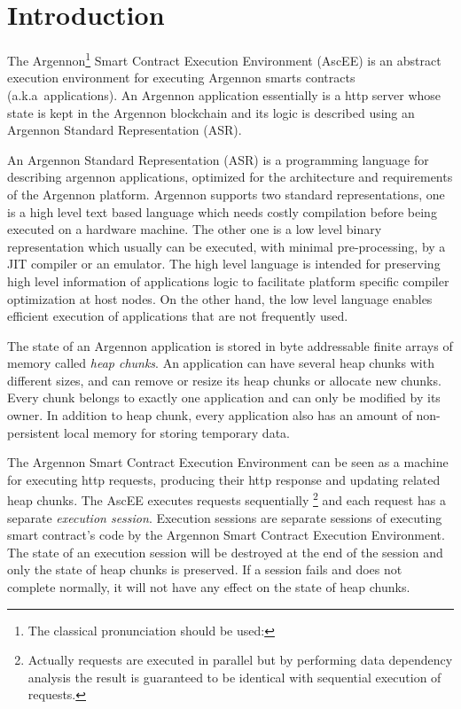 

\section{Introduction}\label{sec:introduction}

The Argennon\footnote{The classical pronunciation should be used:} Smart Contract Execution
Environment (AscEE) is an abstract execution environment for executing Argennon smarts contracts (a.k.a\ applications).
An Argennon application essentially is a http server whose state is kept in the Argennon blockchain and
its logic is described using an Argennon Standard Representation (ASR).

An Argennon Standard Representation (ASR) is a programming language for describing argennon applications, optimized
for the architecture and requirements of the Argennon platform.
Argennon supports two standard representations, one is a high level text based language which needs
costly compilation before being executed on a hardware machine. The other one is a low level binary representation which
usually can be executed, with minimal pre-processing, by a JIT compiler or an emulator. The high level
language is intended for preserving high level information of applications logic to facilitate
platform specific compiler optimization at host nodes. On the other hand, the low level language enables efficient
execution of applications that are not frequently used.

The state of an Argennon application is stored in byte addressable finite arrays of memory called
\emph{heap chunks}. An application can have several heap chunks with different sizes, and can remove or
resize its heap chunks or allocate new chunks. Every chunk belongs to exactly one application and can only be modified
by its owner. In addition to heap chunk, every application also has an amount of non-persistent local memory for
storing temporary data.

The Argennon Smart Contract Execution Environment can be seen as a machine for executing http requests, producing
their http response and updating related heap
chunks. The AscEE executes requests sequentially \footnote{Actually requests are executed in parallel but by
performing data dependency analysis the result is guaranteed to be identical with sequential execution of
requests.} and each request has a separate \emph{execution session}. Execution sessions are separate sessions of
executing smart contract's code by the Argennon Smart Contract Execution Environment. The state of an execution
session will be
destroyed at the end of the session and only the state of heap chunks is preserved. If a session fails and does not
complete normally, it will not have any effect on the state of heap chunks.

